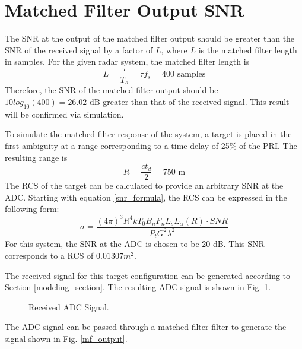 \documentclass[conference]{IEEEtran}
\begin{document}
\section{Matched Filter Output SNR}
The SNR at the output of the matched filter output should be greater than the SNR of the received signal by a factor of $L$, where $L$ is the matched filter length in samples. For the given radar system, the matched filter length is
\begin{equation}
L = \frac{\tau}{T_s} = \tau f_s = 400 \text{ samples}
\end{equation}
Therefore, the SNR of the matched filter output should be $10log_{10}(400)=26.02 \text{ dB}$ greater than that of the received signal. This result will be confirmed via simulation.
\par
To simulate the matched filter response of the system, a target is placed in the first ambiguity at a range corresponding to a time delay of 25\% of the PRI. The resulting range is
\begin{equation}
R = \frac{ct_d}{2} = 750 \text{ m}
\label{tgt1 range}
\end{equation}
The RCS of the target can be calculated to provide an arbitrary SNR at the ADC. Starting with equation \eqref{snr_formula}, the RCS can be expressed in the following form:
\begin{equation}
\sigma = \frac{(4\pi)^3 R^4 k T_0 B_n F_n L_s L_\alpha(R)\cdot SNR}{P_t G^2 \lambda^2}
\end{equation}
For this system, the SNR at the ADC is chosen to be 20 dB. This SNR corresponds to a RCS of $0.01307m^2$.
\par
The received signal for this target configuration can be generated according to Section \ref{modeling_section}. The resulting ADC signal is shown in Fig. \ref{adc_sig}.
\begin{figure}[H]
\centerline{}
\caption{Received ADC Signal.}
\label{adc_sig}
\end{figure}
\noindent
The ADC signal can be passed through a matched filter filter to generate the signal shown in Fig. \ref{mf_output}.
\end{document}
